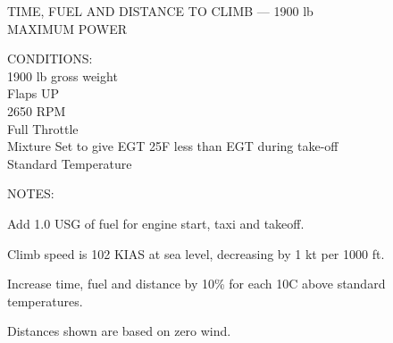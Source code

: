 \begin{figure}[t]
\begin{center}
\begin{perfhdr}TIME, FUEL AND DISTANCE TO CLIMB --- 1900 lb\\
MAXIMUM POWER\\
\end{perfhdr}
\Large
\normalsize \vspace{5ex} 
\raggedright 
    CONDITIONS:\\
    1900 lb gross weight\\
    Flaps UP\\
    2650 RPM\\
    Full Throttle\\
    Mixture Set to give EGT 25\textdegree F less than EGT during take-off\\
    Standard Temperature\\

\hfill

\vspace{\perfnoteskip}
    \raggedright NOTES:
    \begin{enumerate*}
      \item Add 1.0 USG of fuel for engine start, taxi and takeoff.
      \item Climb speed is 102 KIAS at sea level, decreasing by 1 kt per 1000 ft.
      \item Increase time, fuel and distance by 10\% for each 10\textdegree C above standard
      temperatures.
      \item Distances shown are based on zero wind.
      \end{enumerate*}

\vspace{\perfnoteskip}
\settowidth{\colOne}{WEIGHT}
\settowidth{\colTwo}{PRESS.}
\settowidth{\colThree}{TEMP}
\settowidth{\colFour}{CLIMB}
\settowidth{\colFive}{RATE OF}
\settowidth{\colSix}{TIME}
\settowidth{\colSeven}{USED}
\settowidth{\colEight}{DIST.}


\end{center}
\end{figure}
